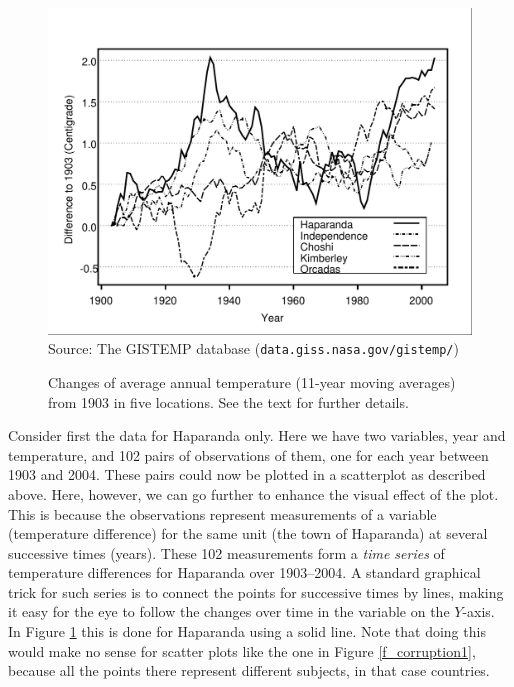 \begin{figure}[t]
\caption{Changes of average annual temperature (11-year moving averages)
from 1903 in five locations. See the text for further details.}
\label{f_temperatures}
\begin{center}
\includegraphics[width=13cm]{temperplot}\\
\footnotesize{Source: The GISTEMP database
(\texttt{data.giss.nasa.gov/gistemp/})}
\end{center}
\vspace*{-2ex}
\end{figure}

Consider first the data for Haparanda only. Here we have two variables,
year and temperature, and 102 pairs of observations of them, one for
each year between 1903 and 2004. These pairs could now be plotted in a
scatterplot as described above. Here, however, we can go further to
enhance the visual effect of the plot. This is because the observations
represent measurements of a variable (temperature difference) for
the same unit (the town of Haparanda) at several successive times
(years). These 102 measurements form a \emph{time series} of temperature
differences for Haparanda over 1903--2004. A standard graphical trick
for such series is to connect the points for successive times by
lines, making it easy for the eye to follow the changes over time in the
variable on the $Y$-axis. In Figure \ref{f_temperatures} this is done
for Haparanda using a solid line. Note that doing this would make no
sense for scatter plots like the one in Figure \ref{f_corruption1}, because
all the points there represent different subjects, in that case countries.

